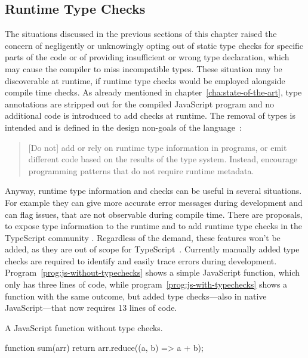 \subsection{Runtime Type Checks}
\label{runtime-type-checks}

The situations discussed in the previous sections of this chapter raised the concern of negligently or unknowingly opting out of static type checks for specific parts of the code or of providing insufficient or wrong type declaration, which may cause the compiler to miss incompatible types. These situation may be discoverable at runtime, if runtime type checks would be employed alongside compile time checks. As already mentioned in chapter~\ref{cha:state-of-the-art}, type annotations are stripped out for the compiled JavaScript program and no additional code is introduced to add checks at runtime. The removal of types is intended and is defined in the design non-goals of the language~\cite{TypeScriptWiki:DesignGoals}:
\begin{quote}
  [Do not] add or rely on runtime type information in programs,
  or emit different code based on the results of the type system.
  Instead, encourage programming patterns that do not require runtime metadata.
\end{quote}
Anyway, runtime type information and checks can be useful in several situations. 
For example they can give more accurate error messages during development and can 
flag issues, that are not observable during compile time.
There are proposals, to expose type information to the runtime and to add runtime type
checks in the TypeScript community \cite{TypeScriptIssue:RuntimeTypeChecking, TypeScriptIssue:RuntimeTypeChecks, TypeScriptIssue:EmitTypeArguments}. Regardless of the demand, these features won't be added, as they are out of scope
for TypeScript~\cite{TypeScriptIssue:RuntimeTypeChecking:Comment:OutOfScope, TypeScriptIssue:EmitTypeArguments:Comment:OutOfScope}.
Currently manually added type checks are required to identify and easily trace errors during development. Program~\ref{prog:js-without-typechecks} shows a simple JavaScript function, which only has three lines of code, while program~\ref{prog:js-with-typechecks} shows a function with the same outcome, but added type 
checks---also in native JavaScript---that now requires 13 lines of code.
\begin{program}
\caption{A JavaScript function without type checks.}
\label{prog:js-without-typechecks}
\begin{JsCode}
function sum(arr) {
  return arr.reduce((a, b) =>  a + b);
}
\end{JsCode}
\end{program}

